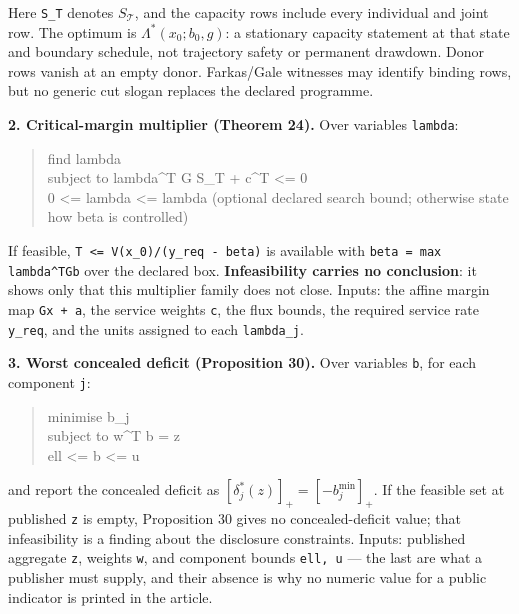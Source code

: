 \documentclass[11pt]{article}
\begin{document}
Here \texttt{S\_T} denotes \(S_{\mathcal T}\), and the capacity rows include every individual and joint row. The optimum is \(\Lambda^*(x_0;b_0,g)\): a stationary capacity statement at that state and boundary schedule, not trajectory safety or permanent drawdown. Donor rows vanish at an empty donor. Farkas/Gale witnesses may identify binding rows, but no generic cut slogan replaces the declared programme.

\textbf{2. Critical-margin multiplier (Theorem 24).} Over variables \texttt{lambda}:

\begin{quote}\ttfamily\footnotesize\raggedright\setlength{\parskip}{0pt}
find   lambda\\
subject to lambda\textasciicircum{}T G S\_T + c\textasciicircum{}T <= 0\\
           0 <= lambda <= lambda        (optional declared search bound; otherwise state how beta is controlled)
\end{quote}

If feasible, \texttt{T <= V(x\_0)/\allowbreak{}(y\_req - bet\allowbreak{}a)} is available with \texttt{beta = max l\allowbreak{}ambda\textasciicircum{}TGb} over the declared box. \textbf{Infeasibility carries no conclusion}: it shows only that this multiplier family does not close. Inputs: the affine margin map \texttt{Gx + a}, the service weights \texttt{c}, the flux bounds, the required service rate \texttt{y\_req}, and the units assigned to each \texttt{lambda\_j}.

\textbf{3. Worst concealed deficit (Proposition 30).} Over variables \texttt{b}, for each component \texttt{j}:

\begin{quote}\ttfamily\footnotesize\raggedright\setlength{\parskip}{0pt}
minimise   b\_j\\
subject to w\textasciicircum{}T b = z\\
           ell <= b <= u
\end{quote}

and report the concealed deficit as \([\delta_j^*(z)]_+=[-b_j^{\min}]_+\). If the feasible set at published \texttt{z} is empty, Proposition 30 gives no concealed-deficit value; that infeasibility is a finding about the disclosure constraints. Inputs: published aggregate \texttt{z}, weights \texttt{w}, and component bounds \texttt{ell, u} --- the last are what a publisher must supply, and their absence is why no numeric value for a public indicator is printed in the article.
\end{document}
